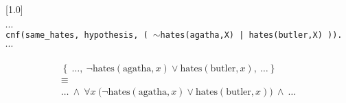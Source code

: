 \scalebox{0.8}[1.0]{
	\begin{minipage}{40em}
		\texttt{$\cdots$\\
		cnf(same\_hates, hypothesis, ( $\sim$hates(agatha,X) | hates(butler,X) )).\\
		$\cdots$
		}
	\end{minipage}
}
\begin{gather*}
	\left\{\ \ldots,\
	\lnot \text{hates}(\text{agatha},x)
	\lor 
	\text{hates}(\text{butler},x),\ \ldots\right\} 
	\\\equiv\\
	\ldots\ \land\ 
	\forall x\ {(}
	\lnot \text{hates}(\text{agatha},x)
	\lor 
	\text{hates}(\text{butler},x) {)}
	\  \land\ \ldots 
\end{gather*}
